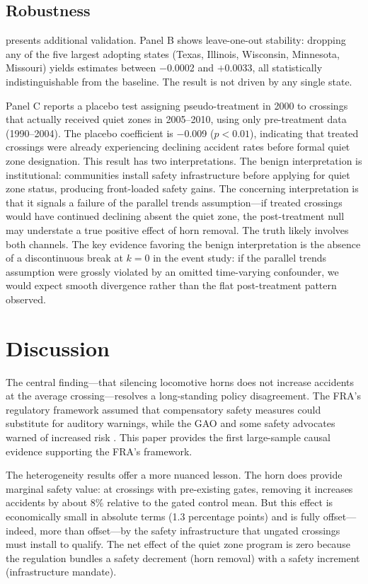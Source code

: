 \documentclass[12pt]{article}
\begin{document}
\subsection{Robustness}

 presents additional validation. Panel B shows leave-one-out stability: dropping any of the five largest adopting states (Texas, Illinois, Wisconsin, Minnesota, Missouri) yields estimates between $-$0.0002 and $+$0.0033, all statistically indistinguishable from the baseline. The result is not driven by any single state.

Panel C reports a placebo test assigning pseudo-treatment in 2000 to crossings that actually received quiet zones in 2005--2010, using only pre-treatment data (1990--2004). The placebo coefficient is $-$0.009 ($p < 0.01$), indicating that treated crossings were already experiencing declining accident rates before formal quiet zone designation. This result has two interpretations. The benign interpretation is institutional: communities install safety infrastructure before applying for quiet zone status, producing front-loaded safety gains. The concerning interpretation is that it signals a failure of the parallel trends assumption---if treated crossings would have continued declining absent the quiet zone, the post-treatment null may understate a true positive effect of horn removal. The truth likely involves both channels. The key evidence favoring the benign interpretation is the absence of a discontinuous break at $k = 0$ in the event study: if the parallel trends assumption were grossly violated by an omitted time-varying confounder, we would expect smooth divergence rather than the flat post-treatment pattern observed.




\section{Discussion}

The central finding---that silencing locomotive horns does not increase accidents at the average crossing---resolves a long-standing policy disagreement. The FRA's regulatory framework assumed that compensatory safety measures could substitute for auditory warnings, while the GAO and some safety advocates warned of increased risk \citep{gao2011train}. This paper provides the first large-sample causal evidence supporting the FRA's framework.

The heterogeneity results offer a more nuanced lesson. The horn does provide marginal safety value: at crossings with pre-existing gates, removing it increases accidents by about 8\% relative to the gated control mean. But this effect is economically small in absolute terms (1.3 percentage points) and is fully offset---indeed, more than offset---by the safety infrastructure that ungated crossings must install to qualify. The net effect of the quiet zone program is zero because the regulation bundles a safety decrement (horn removal) with a safety increment (infrastructure mandate).
\end{document}
